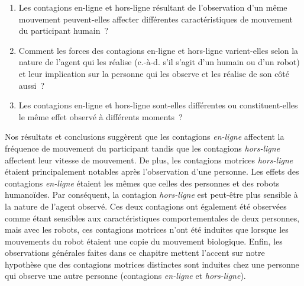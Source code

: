 \begin{enumerate}
	\item Les contagions en-ligne et hors-ligne résultant de l'observation d'un même mouvement peuvent-elles affecter différentes caractéristiques de mouvement du participant humain~?
	\item Comment les forces des contagions en-ligne et hors-ligne varient-elles selon la nature de l'agent qui les réalise (c.-à-d. s'il s'agit d'un humain ou d'un robot) et leur implication sur la personne qui les observe et les réalise de son côté aussi~?
	\item Les contagions en-ligne et hors-ligne sont-elles différentes ou constituent-elles le même effet observé à différents moments~?
\end{enumerate}




Nos résultats et conclusions suggèrent que les contagions \textit{en-ligne} affectent la fréquence de mouvement du participant tandis que les contagions \textit{hors-ligne} affectent leur vitesse de mouvement. De plus, les contagions motrices \textit{hors-ligne} étaient principalement notables après l'observation d'une personne. Les effets des contagions \textit{en-ligne} étaient les mêmes que celles des personnes et des robots humanoïdes. Par conséquent, la contagion \textit{hors-ligne} est peut-être plus sensible à la nature de l'agent observé. Ces deux contagions ont également été observées comme étant sensibles aux caractéristiques comportementales de deux personnes, mais avec les robots, ces contagions motrices n'ont été induites que lorsque les mouvements du robot étaient une copie du mouvement biologique. Enfin, les observations générales faites dans ce chapitre mettent l'accent sur notre hypothèse que des contagions motrices distinctes sont induites chez une personne qui observe une autre personne (contagions \textit{en-ligne} et \textit{hors-ligne}).


